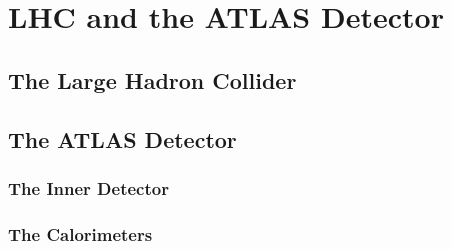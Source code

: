 \chapter[LHC and the ATLAS Detector][LHC and the ATLAS Detector]{LHC and the ATLAS Detector}
\label{ch:detector}

\section{The Large Hadron Collider}\label{sec:lhc}


\section{The ATLAS Detector}\label{sec:atlas}


\subsection{The Inner Detector}\label{sec:id}


\subsection{The Calorimeters}\label{sec:calorimeters}

